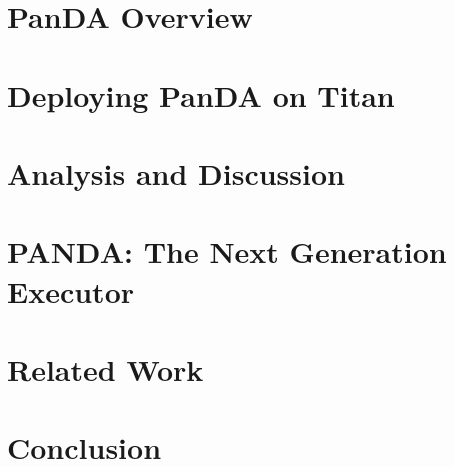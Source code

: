\documentclass[conference]{IEEEtran}
\begin{document}
\section{PanDA Overview}\label{sec:panda_overview}



\section{Deploying PanDA on Titan}\label{sec:panda_titan}



\section{Analysis and Discussion}\label{sec:analysis}



\section{PANDA\@: The Next Generation Executor}\label{sec:panda_roadmap}




\section{Related Work}\label{sec:related}



\section{Conclusion}\label{sec:conclusion}






\end{document}
